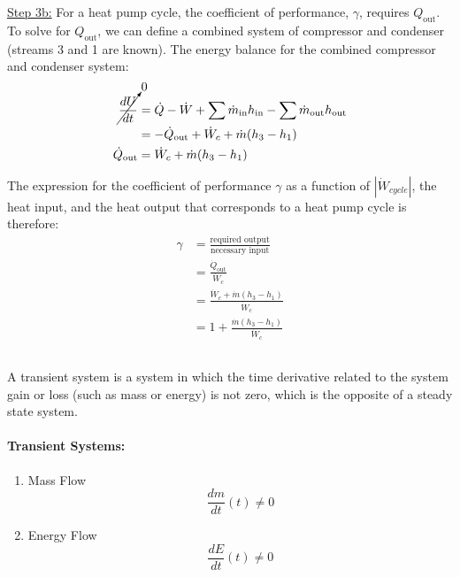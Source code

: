 \documentclass{article}
\begin{document}
\underline{Step 3b:} For a heat pump cycle, the coefficient of performance, $\gamma$, requires $Q_\text{out}$. To solve for $Q_\text{out}$, we can define a combined system of compressor and condenser (streams 3 and 1 are known). The energy balance for the combined compressor and condenser system:
\[\begin{aligned}
\cancelto{0}{\frac{dU}{dt}} &= \dot{Q} - \dot{W} + \sum \dot{m}_\text{in} h_\text{in} - \sum \dot{m}_\text{out} h_\text{out} \\
&= - \dot{Q}_\text{out} + \dot{W}_c + \dot{m} (h_\text{3} - h_\text{1}) \\
\dot{Q}_\text{out} &= \dot{W}_c + \dot{m} (h_\text{3} - h_\text{1})
\end{aligned}\]

The expression for the coefficient of performance $\gamma$ as a function of $|\dot{W}_{cycle}|$, the heat input, and the heat output that corresponds to a heat pump cycle is therefore:
\[\begin{aligned}
\gamma &= \frac{\text{required output}}{\text{necessary input}} \\
&= \frac{\dot{Q}_\text{out}}{\dot{W}_c} \\
&= \frac{\dot{W}_c + \dot{m}(h_3-h_1)}{\dot{W}_c} \\
&= 1 + \frac{\dot{m}(h_3-h_1)}{\dot{W}_c}
\end{aligned}\]

\subsection{}
A transient system is a system in which the time derivative related to the system gain or loss (such as mass or energy) is not zero, which is the opposite of a steady state system.
\paragraph{Transient Systems:}
\begin{enumerate}
    \item Mass Flow
    \begin{equation*}
        {\frac{dm}{dt}(t)}\neq 0
    \end{equation*}
    \item Energy Flow
    \begin{equation*}
        {\frac{dE}{dt}(t)}\neq 0
    \end{equation*}
\end{enumerate}
\end{document}
